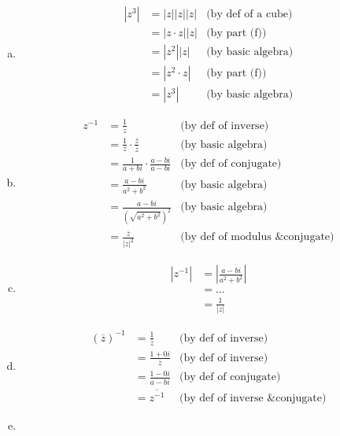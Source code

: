 \begin{enumerate}[(a)]
\item
\begin{align*}
\left|z^{3}\right| &= \left|z\right|\left|z\right|\left|z\right| &\text{(by def of a cube)}\\
&= \left|z \cdot z\right|\left|z\right| &\text{(by part (f))}\\
&= \left|z^{2}\right|\left|z\right| &\text{(by basic algebra)}\\
&= \left|z^{2} \cdot z\right| &\text{(by part (f))}\\
&= \left|z^{3}\right| &\text{(by basic algebra)}
\end{align*}

\item 
\begin{align*}
z^{-1} &= \frac{1}{z} &\text{(by def of inverse)}\\
&= \frac{1}{z} \cdot \frac{\overline{z}}{\overline{z}} &\text{(by basic algebra)}\\
&= \frac{1}{a + bi} \cdot \frac{a - bi}{a - bi} &\text{(by def of conjugate)}\\
&= \frac{a - bi}{a^{2} + b^{2}} &\text{(by basic algebra)}\\
&= \frac{a - bi}{(\sqrt{a^{2} + b^{2}})^{2}} &\text{(by basic algebra)}\\
&= \frac{\overline{z}}{\left|z\right|^{2}} &\text{(by def of modulus \& conjugate)}
\end{align*}

\item 
\begin{align*}
\left|z^{-1}\right| &= \left|\displaystyle\frac{a-bi}{a^{2}+b^{2}}\right|\\
&= \ldots\\
&= \displaystyle\frac{1}{\left|z\right|}
\end{align*}

\item 
\begin{align*}
(\overline{z})^{-1} &= \frac{1}{\overline{z}} &\text{(by def of inverse)}\\
&= \frac{1 + 0i}{\overline{z}} &\text{(by def of inverse)}\\
&= \frac{1 - 0i}{a - bi} &\text{(by def of conjugate)}\\
&= \overline{z^{-1}} &\text{(by def of inverse \& conjugate)}
\end{align*}

\item 
\end{enumerate}


